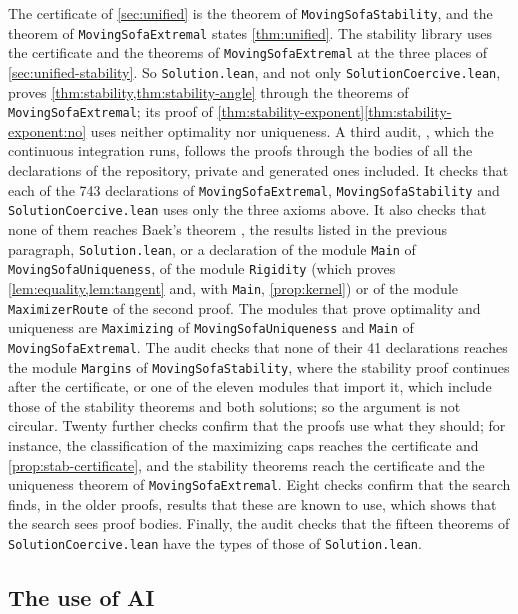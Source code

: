 The certificate of \cref{sec:unified} is the theorem
 of \texttt{MovingSofaStability}, and the theorem
 of \texttt{MovingSofaExtremal} states
\cref{thm:unified}. The stability library uses the certificate and the theorems
of \texttt{MovingSofaExtremal} at the three places of
\cref{sec:unified-stability}. So \texttt{Solution.lean}, and not only
\texttt{SolutionCoercive.lean}, proves \cref{thm:stability,thm:stability-angle}
through the theorems of \texttt{MovingSofaExtremal}; its proof of
\cref{thm:stability-exponent}\ref{thm:stability-exponent:no} uses neither
optimality nor uniqueness. A third audit,
, which the continuous integration runs,
follows the proofs through the bodies of all the declarations of the repository,
private and generated ones included. It checks that each of the 743 declarations
of \texttt{MovingSofaExtremal}, \texttt{MovingSofaStability} and
\texttt{SolutionCoercive.lean} uses only the three axioms above. It also checks
that none of them reaches Baek's theorem , the results listed
in the previous paragraph, \texttt{Solution.lean}, or a declaration of the
module \texttt{Main} of \texttt{MovingSofaUniqueness}, of the module
\texttt{Rigidity} (which proves \cref{lem:equality,lem:tangent} and, with
\texttt{Main}, \cref{prop:kernel}) or of the module \texttt{MaximizerRoute} of
the second proof. The modules that prove optimality and uniqueness are
\texttt{Maximizing} of \texttt{MovingSofaUniqueness} and \texttt{Main} of
\texttt{MovingSofaExtremal}. The audit checks that none of their 41
declarations reaches the module \texttt{Margins} of \texttt{MovingSofaStability},
where the stability proof continues after the certificate, or one of the eleven
modules that import it, which include those of the stability theorems and both
solutions; so the argument is not circular. Twenty further checks
confirm that the proofs use what they should; for instance, the classification
of the maximizing caps reaches the certificate and \cref{prop:stab-certificate},
and the stability theorems reach the certificate and the uniqueness theorem of
\texttt{MovingSofaExtremal}. Eight checks confirm that the search finds, in the
older proofs, results that these are known to use, which shows that the search
sees proof bodies. Finally, the audit checks that the fifteen theorems of
\texttt{SolutionCoercive.lean} have the types of those of
\texttt{Solution.lean}.

\subsection{The use of AI}

